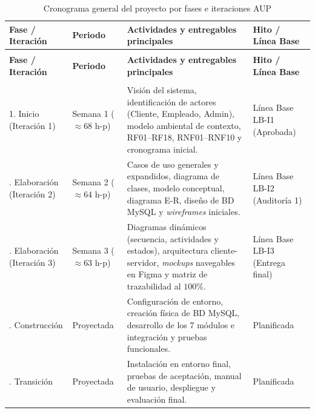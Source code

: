 {\small
\begin{xltabular}{\textwidth}{|>{\raggedright\arraybackslash}p{2.4cm}|>{\raggedright\arraybackslash}p{2.2cm}|X|>{\raggedright\arraybackslash}p{2.6cm}|}
    \caption{Cronograma general del proyecto por fases e iteraciones AUP}
    \label{tab:cronograma_aup} \\
    \hline
    \textbf{Fase / Iteración} & \textbf{Periodo} & \textbf{Actividades y entregables principales} & \textbf{Hito / Línea Base} \\
    \hline
    \endfirsthead

     \\
    \hline
    \textbf{Fase / Iteración} & \textbf{Periodo} & \textbf{Actividades y entregables principales} & \textbf{Hito / Línea Base} \\
    \hline
    \endhead

     \\
    \endfoot

    \endlastfoot

    1. Inicio \newline (Iteración 1) & Semana 1 \newline ($\approx 68$ h-p) & Visión del sistema, identificación de actores (Cliente, Empleado, Admin), modelo ambiental de contexto, RF01--RF18, RNF01--RNF10 y cronograma inicial. & Línea Base LB-I1 (Aprobada) \\*
    . Elaboración \newline (Iteración 2) & Semana 2 \newline ($\approx 64$ h-p) & Casos de uso generales y expandidos, diagrama de clases, modelo conceptual, diagrama E-R, diseño de BD MySQL y \textit{wireframes} iniciales. & Línea Base LB-I2 (Auditoría 1) \\*
    . Elaboración \newline (Iteración 3) & Semana 3 \newline ($\approx 63$ h-p) & Diagramas dinámicos (secuencia, actividades y estados), arquitectura cliente-servidor, \textit{mockups} navegables en Figma y matriz de trazabilidad al $100\%$. & Línea Base LB-I3 (Entrega final) \\*
    . Construcción & Proyectada & Configuración de entorno, creación física de BD MySQL, desarrollo de los 7 módulos e integración y pruebas funcionales. & Planificada \\*
    . Transición & Proyectada & Instalación en entorno final, pruebas de aceptación, manual de usuario, despliegue y evaluación final. & Planificada \\
    \hline
\end{xltabular}
}

